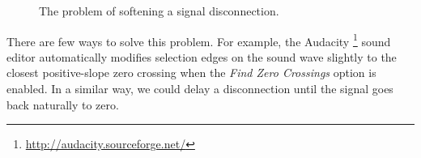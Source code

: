 \begin{figure}[t]
  \centering 

  
  \caption{The problem of softening a signal disconnection.}
\label{fig:soft-port-0}
\end{figure}

There are few ways to solve this problem. For example, the Audacity
\footnote{\url{http://audacity.sourceforge.net/}} sound editor
automatically modifies selection edges on the sound wave slightly to the
closest positive-slope zero crossing when the \emph{Find Zero
  Crossings} option is enabled. In a similar way, we could delay a
disconnection until the signal goes back naturally to zero.

